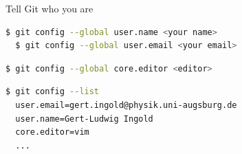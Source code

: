\documentclass[svgnames]{beamer}
\begin{document}
\begin{frame}[fragile]{Tell Git who you are}

 \begin{lstlisting}[backgroundcolor=\color{black!10}, language=bash]
  $ git config --global user.name <your name>
  $ git config --global user.email <your email>
 \end{lstlisting}

 \vspace{\baselineskip}
 \begin{lstlisting}[backgroundcolor=\color{black!10}, language=bash]
  $ git config --global core.editor <editor>
 \end{lstlisting}

 \vspace{\baselineskip}
 \begin{lstlisting}[backgroundcolor=\color{black!10}, language=bash]
  $ git config --list
  user.email=gert.ingold@physik.uni-augsburg.de
  user.name=Gert-Ludwig Ingold
  core.editor=vim
  ...
 \end{lstlisting}
\end{frame}
\end{document}
